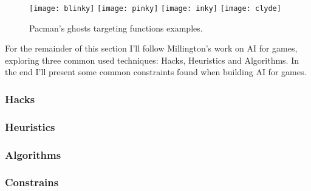 \begin{figure}
\texttt{[image: blinky]}
\texttt{[image: pinky]}
\texttt{[image: inky]}
\texttt{[image: clyde]}
  \caption{Pacman's ghosts targeting functions examples.}
  \label{fig:ghosts-targeting}
\end{figure}

For the remainder of this section I'll follow Millington's work \cite{millington:AIgames} on \ac{AI} for games, exploring three common used techniques: Hacks, Heuristics and Algorithms.
In the end I'll present some common constraints found when building \ac{AI} for games.

\subsubsection{Hacks}
\subsubsection{Heuristics}
\subsubsection{Algorithms}
\subsubsection{Constrains}